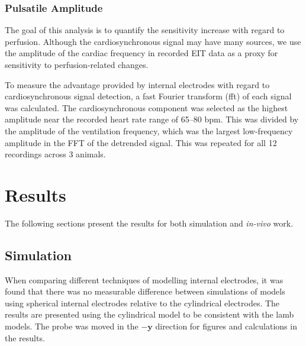 \subsubsection{Pulsatile Amplitude}
The goal of this analysis is to quantify the sensitivity increase with regard to perfusion. 
Although the cardiosynchronous signal may have many sources, we use the 
amplitude of the cardiac frequency in recorded EIT data as a proxy for sensitivity to 
perfusion-related changes. 

To measure the advantage provided by internal electrodes with regard to cardiosynchronous
signal detection, 
a fast Fourier transform (\acrshort{fft}) of each signal was calculated. 
The cardiosynchronous component was selected as the highest 
amplitude near the recorded heart rate range of 65--80 bpm.
This was divided by the amplitude of the ventilation frequency, which was the largest
low-frequency amplitude in the FFT of the detrended signal. 
This was repeated for all 12 recordings across 3 animals.

\section{Results}
The following sections present the results for both simulation and 
\emph{in-vivo} work.

\subsection{Simulation}
When comparing different techniques of modelling internal electrodes, 
it was found that there was no measurable difference between 
simulations of models using spherical internal electrodes 
relative to the
cylindrical electrodes. The results are presented
using the cylindrical model to be consistent with the 
lamb models.
The probe was moved in the $-\mathbf{y}$ direction for figures and calculations
in the results.

